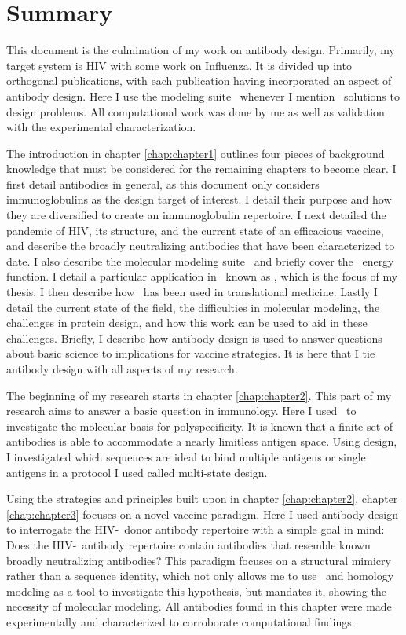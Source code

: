 \chapter*{Summary}
\vspace{7mm}
This document is the culmination of my work on antibody design. Primarily, my target system is HIV with some work on Influenza. It is divided up into orthogonal publications, with each publication having incorporated an aspect of antibody design. Here I use the modeling suite \rosetta~whenever I mention \silico~solutions to design problems. All computational work was done by me as well as validation with the experimental characterization.

The introduction in chapter \ref{chap:chapter1} outlines four pieces of background knowledge that must be considered for the remaining chapters to become clear. I first detail antibodies in general, as this document only considers immunoglobulins as the design target of interest. I detail their purpose and how they are diversified to create an immunoglobulin repertoire. I next detailed the pandemic of HIV, its structure, and the current state of an efficacious vaccine, and describe the broadly neutralizing antibodies that have been characterized to date. I also describe the molecular modeling suite \rosetta~and briefly cover the \rosetta~energy function. I detail a particular application in \rosetta~known as \rosettadesign, which is the focus of my thesis. I then describe how \rosettadesign~has been used in translational medicine. Lastly I detail the current state of the field, the difficulties in molecular modeling, the challenges in protein design, and how this work can be used to aid in these challenges. Briefly, I describe how antibody design is used to answer questions about basic science to implications for vaccine strategies. It is here that I tie antibody design with all aspects of my research.

The beginning of my research starts in chapter \ref{chap:chapter2}. This part of my research aims to answer a basic question in immunology. Here I used \rosettadesign~to investigate the molecular basis for polyspecificity. It is known that a finite set of antibodies is able to accommodate a nearly limitless antigen space. Using design, I investigated which sequences are ideal to bind multiple antigens or single antigens in a protocol I used called multi-state design.

Using the strategies and principles built upon in chapter \ref{chap:chapter2}, chapter \ref{chap:chapter3} focuses on a novel vaccine paradigm. Here I used antibody design to interrogate the HIV-\naive~donor antibody repertoire with a simple goal in mind: Does the HIV-\naive~antibody repertoire contain antibodies that resemble known broadly neutralizing antibodies? This paradigm focuses on a structural mimicry rather than a sequence identity, which not only allows me to use \rosettadesign~and homology modeling as a tool to investigate this hypothesis, but mandates it, showing the necessity of molecular modeling. All antibodies found in this chapter were made experimentally and characterized to corroborate computational findings.


